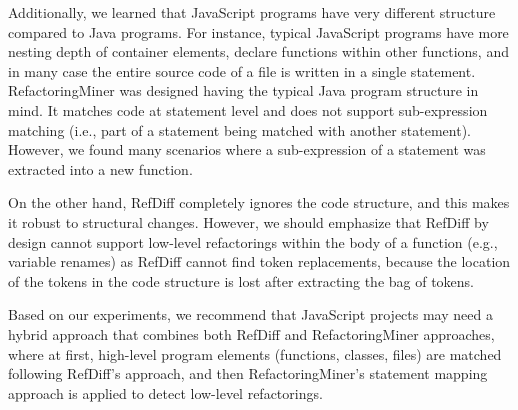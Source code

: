 \documentclass[letterpaper,12pt,onecolumn,final]{report}
\begin{document}
Additionally, we learned that JavaScript programs have very different structure compared to Java programs.
For instance, typical JavaScript programs have more nesting depth of container elements, declare functions within other functions, and in many case the entire source code of a file is written in a single statement.
RefactoringMiner was designed having the typical Java program structure in mind.
It matches code at statement level and does not support sub-expression matching (i.e., part of a statement being matched with another statement).
However, we found many scenarios where a sub-expression of a statement was extracted into a new function.

On the other hand, RefDiff completely ignores the code structure, and this makes it robust to structural changes. However, we should emphasize that RefDiff by design cannot support low-level refactorings within the body of a function (e.g., variable renames) as RefDiff cannot find token replacements, because the location of the tokens in the code structure is lost after extracting the bag of tokens.

Based on our experiments, we recommend that JavaScript projects may need a hybrid approach that combines both RefDiff and RefactoringMiner approaches, where at first, high-level program elements (functions, classes, files) are matched following RefDiff's approach, and then RefactoringMiner's statement mapping approach is applied to detect low-level refactorings.

\clearpage
{}
{}  %
\singlespacing %





\appendix
\setcounter{table}{0}		%
\setcounter{figure}{0}		%
\renewcommand{\thefigure}{\Alph{chapter}.\arabic{figure}} 	%
\renewcommand{\thetable}{\Alph{chapter}.\arabic{table}}		%
\end{document}
